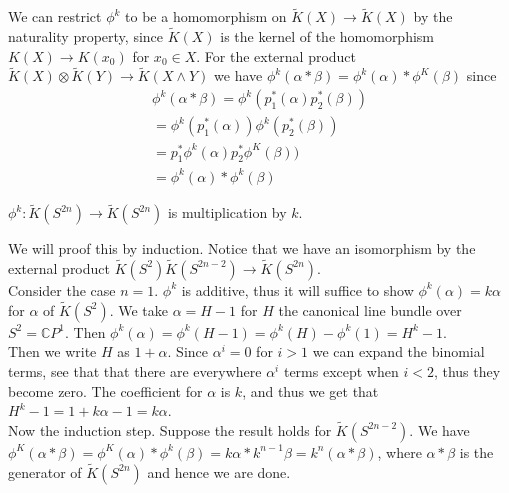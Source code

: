 \documentclass[../Thesis.tex]{subfiles}
\begin{document}
We can restrict $\phi^k$ to be a homomorphism on $\tilde{K}(X) \rightarrow \tilde{K}(X)$ by the naturality property, since $\tilde{K}(X)$ is the kernel of the homomorphism $K(X) \rightarrow K(x_0)$ for $x_0 \in X$. For the external product $\tilde{K}(X) \otimes \tilde{K}(Y) \rightarrow \tilde{K}( X \wedge Y)$ we have $\phi^k(\alpha * \beta) = \phi^k(\alpha) * \phi^K(\beta)$ since
\begin{eqnarray}
\phi^k(\alpha * \beta) = \phi^k( p_1^*(\alpha)p_2^*(\beta))\\
                       = \phi^k( p_1^*(\alpha)) \phi^k(p_2^*(\beta))\\
                       = p_1^* \phi^k(\alpha) p_2^*\phi^K(\beta))\\
                       = \phi^k(\alpha) * \phi^k(\beta)
\end{eqnarray}
\begin{prop}
$\phi^k : \tilde{K}(S^{2n}) \rightarrow \tilde{K}(S^{2n})$ is multiplication by $k$.
\end{prop}
\begin{myproof}
We will proof this by induction. Notice that we have an isomorphism by the external product $\tilde{K}(S^2) \tilde{K}(S^{2n-2}) \rightarrow \tilde{K}(S^{2n})$.
\\Consider the case $n = 1$. $\phi^k$ is additive, thus it will suffice to show $\phi^k(\alpha) = k\alpha$ for $\alpha$ of $\tilde{K}(S^2)$. We take $\alpha = H-1$ for $H$ the canonical line bundle over $S^2 = \mathbb{C}P^1$. Then $\phi^k(\alpha) = \phi^k(H-1) = \phi^k(H) - \phi^k(1) = H^k - 1$.
\\Then we write $H$ as $1 + \alpha$. Since $\alpha^i = 0$ for $i > 1$ we can expand the binomial terms, see that that there are everywhere $\alpha^i$ terms except when $ i < 2$, thus they become zero. The coefficient for $\alpha$ is $k$, and thus we get that $H^k -1  = 1 + k\alpha -1 = k\alpha$.
\\Now the induction step. Suppose the result holds for $\tilde{K}(S^{2n-2})$. We have $\phi^K( \alpha * \beta) = \phi^K(\alpha) * \phi^k(\beta) = k\alpha* k^{n-1}\beta = k^n(\alpha*\beta)$, where $\alpha* \beta$ is the generator of $\tilde{K}(S^{2n})$ and hence we are done.
\end{myproof}
\end{document}
